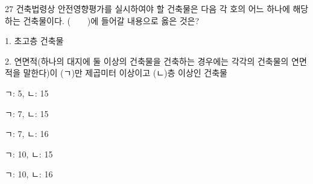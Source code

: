 \begin{question}{27}
건축법령상 안전영향평가를 실시하여야 할 건축물은 다음 각 호의 어느 하나에 해당하는 건축물이다. (　　)에 들어갈 내용으로 옳은 것은?
\begin{framedtext}
1. 초고층 건축물 \par
2. 연면적(하나의 대지에 둘 이상의 건축물을 건축하는 경우에는 각각의 건축물의 연면적을 말한다)이 (ㄱ)만 제곱미터 이상이고 (ㄴ)층 이상인 건축물 \par
\end{framedtext}
\begin{choices}
  \item ㄱ: 5, ㄴ: 15
  \item ㄱ: 7, ㄴ: 15
  \item ㄱ: 7, ㄴ: 16
  \item ㄱ: 10, ㄴ: 15
  \item ㄱ: 10, ㄴ: 16
\end{choices}
\end{question}
